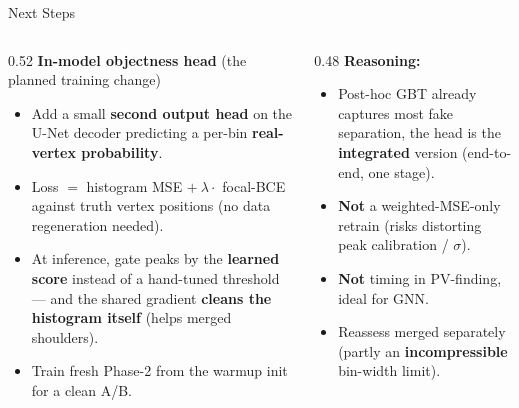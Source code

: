 \documentclass[xcolor=table,aspectratio=169]{beamer}
\begin{document}
\begin{frame}{Next Steps}
    \begin{columns}[t]
        \begin{column}{0.52\linewidth}
            \small
            \textbf{In-model objectness head} (the planned training change)
            \begin{itemize}\setlength\itemsep{0.3em}
                \item Add a small \textbf{second output head} on the U-Net decoder
                predicting a per-bin \textbf{real-vertex probability}.
                \item Loss $=$ histogram MSE $+\ \lambda\cdot$ focal-BCE against
                truth vertex positions (no data regeneration needed).
                \item At inference, gate peaks by the \textbf{learned score}
                instead of a hand-tuned threshold --- and the shared gradient
                \textbf{cleans the histogram itself} (helps merged shoulders).
                \item Train fresh Phase-2 from the warmup init for a clean A/B.
            \end{itemize}
        \end{column}
        \begin{column}{0.48\linewidth}
            \small
            \textbf{Reasoning:}
            \begin{itemize}\setlength\itemsep{0.3em}
                \item Post-hoc GBT already captures most fake separation, the
                head is the \textbf{integrated} version (end-to-end, one stage).
                \item \textbf{Not} a weighted-MSE-only retrain (risks distorting
                peak calibration / $\sigma$).
                \item \textbf{Not} timing in PV-finding, ideal for GNN.
                \item Reassess merged separately (partly an
                \textbf{incompressible} bin-width limit).
            \end{itemize}
        \end{column}
    \end{columns}
\end{frame}

\end{document}
